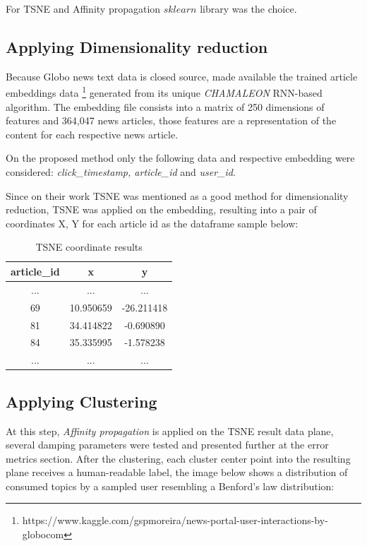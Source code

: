 \documentclass[ecp,tc,english]{iiufrgs}
\begin{document}
        For TSNE and Affinity propagation \(sklearn\) library was the choice.
        
        \subsection{Applying Dimensionality reduction}
        Because Globo news text data is closed source, \cite{deSouzaPereiraMoreira:2018:CDL:3240323.3240331} made available the trained article embeddings data \footnote{https://www.kaggle.com/gspmoreira/news-portal-user-interactions-by-globocom} generated from its unique \textit{CHAMALEON} RNN-based algorithm. The embedding file consists into a matrix of 250 dimensions of features and 364,047 news articles, those features are a representation of the content for each respective news article.
    
        On the proposed method only the following data and respective embedding were considered: \textit{click\_timestamp, article\_id} and \textit{{}user\_id}.
        
    
        Since on their work TSNE was mentioned as a good method for dimensionality reduction, TSNE was applied on the embedding, resulting into a pair of coordinates X, Y for each article id as the dataframe sample below:
        
        \begin{table}[!ht]
            \centering
            \begin{tabular}{ |c|c|c| } 
                \hline
                article\_id & x & y \\
                \hline 
                ... & ... & ... \\
                69 & 10.950659 & -26.211418 \\ 
                81 & 34.414822 & -0.690890 \\ 
                84 & 35.335995 & -1.578238 \\ 
                ... & ... & ... \\
                \hline
            \end{tabular}
            \caption{TSNE coordinate results}
            \label{tab:tsne_results}
        \end{table}
        
        \subsection{Applying Clustering}
        At this step, \textit{Affinity propagation} is applied on the TSNE result data plane, several damping parameters were tested and presented further at the error metrics section. 
        After the clustering, each cluster center point into the resulting plane receives a human-readable label, the image below shows a distribution of consumed topics by a sampled user resembling a 
        Benford's law distribution:
        \newline
        
\end{document}
